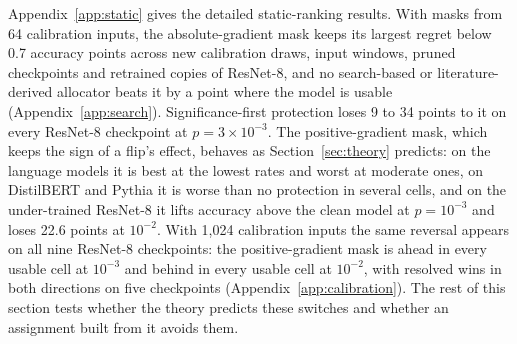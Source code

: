 Appendix~\ref{app:static} gives the detailed static-ranking results. With masks from 64 calibration inputs, the absolute-gradient mask keeps its largest regret below 0.7 accuracy points across new calibration draws, input windows, pruned checkpoints and retrained copies of ResNet-8, and no search-based or literature-derived allocator beats it by a point where the model is usable (Appendix~\ref{app:search}). Significance-first protection loses 9 to 34 points to it on every ResNet-8 checkpoint at $p=3\times10^{-3}$. The positive-gradient mask, which keeps the sign of a flip's effect, behaves as Section~\ref{sec:theory} predicts: on the language models it is best at the lowest rates and worst at moderate ones, on DistilBERT and Pythia it is worse than no protection in several cells, and on the under-trained ResNet-8 it lifts accuracy above the clean model at $p=10^{-3}$ and loses 22.6 points at $10^{-2}$. With 1,024 calibration inputs the same reversal appears on all nine ResNet-8 checkpoints: the positive-gradient mask is ahead in every usable cell at $10^{-3}$ and behind in every usable cell at $10^{-2}$, with resolved wins in both directions on five checkpoints (Appendix~\ref{app:calibration}). The rest of this section tests whether the theory predicts these switches and whether an assignment built from it avoids them.

